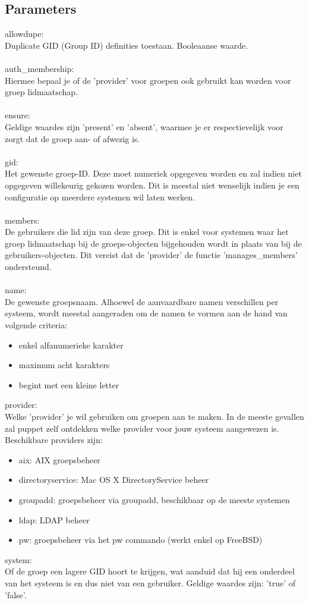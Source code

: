 \subsection{Parameters}
allowdupe:\\
Duplicate GID (Group ID) definities toestaan. Booleaanse waarde.\\\\
%
auth\_membership:\\
Hiermee bepaal je of de 'provider' voor groepen ook gebruikt kan worden voor groep lidmaatschap.\\\\
%
ensure:\\
Geldige waardes zijn 'present' en 'absent', waarmee je er respectievelijk voor zorgt dat de groep aan- of afwezig is.\\\\
%
gid:\\
Het gewenste groep-ID. Deze moet numeriek opgegeven worden en zal indien niet opgegeven willekeurig gekozen worden. Dit is meestal niet wenselijk indien je een configuratie op meerdere systemen wil laten werken.\\\\
%
members:\\
De gebruikers die lid zijn van deze groep. Dit is enkel voor systemen waar het groep lidmaatschap bij de groeps-objecten bijgehouden wordt in plaats van bij de gebruikers-objecten. Dit vereist dat de 'provider' de functie 'manages\_members' ondersteund.\\\\
%
name:\\
De gewenste groepsnaam. Alhoewel de aanvaardbare namen verschillen per systeem, wordt meestal aangeraden om de namen te vormen aan de hand van volgende criteria:
\begin{itemize}
\item enkel alfanumerieke karakter
\item maximum acht karakters
\item begint met een kleine letter
\end{itemize}
%
provider:\\
Welke 'provider' je wil gebruiken om groepen aan te maken. In de meeste gevallen zal puppet zelf ontdekken welke provider voor jouw systeem aangewezen is. Beschikbare providers zijn:
\begin{itemize}
\item aix: AIX groepsbeheer
\item directoryservice: Mac OS X DirectoryService beheer
\item groupadd: groepsbeheer via groupadd, beschikbaar op de meeste systemen
\item ldap: LDAP beheer
\item pw: groepsbeheer via het pw commando (werkt enkel op FreeBSD)
\end{itemize}
%
system:\\
Of de groep een lagere GID hoort te krijgen, wat aanduid dat hij een onderdeel van het systeem is en dus niet van een gebruiker. Geldige waardes zijn: 'true' of 'false'.
